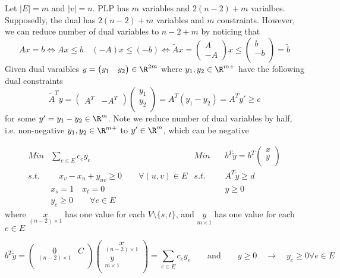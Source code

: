 \documentclass[11pt]{article}
\begin{document}
\noindent Let $|E| = m$ and $|v| = n$. PLP has $m$ variables and $2(n-2)+m$ varialbes. Supposedly, the dual has $2(n-2) + m$ variables and $m$ constraints. However, we can reduce number of dual variables to $n-2+m$ by noticing that 
\[
    Ax = b \iff Ax \leq b \quad (-A) x \leq (-b) \iff 
    \tilde{A}x =
    \begin{pmatrix}
        A \\
        -A
    \end{pmatrix}
    x \leq 
    \begin{pmatrix}
        b \\
        -b \\
    \end{pmatrix}
    =  \tilde{b}
\]
Given dual varaibles $y = \begin{pmatrix} y_1 & y_2 \end{pmatrix} \in\R^{2m}$ where $y_1,y_2\in\R^{m+}$ have the following dual constraints 
\[
    \tilde{A}^T y = 
    \begin{pmatrix}
        A^T & -A^T 
    \end{pmatrix}
    \begin{pmatrix}
        y_1 \\
        y_2 \\ 
    \end{pmatrix} 
    = A^T(y_1 - y_2) 
    = A^T y'
    \geq c 
\]
for some $y' = y_1 - y_2 \in\R^m$. Note we reduce number of dual variables by half, i.e. non-negative $y_1,y_2 \in\R^{m+}$ to $y' \in\R^m$, which can be negative

\begin{align*}
    Min &\sum_{e\in E} c_e y_e 
    &
    Min \quad &b^T \tilde{y}
    = b^T \begin{pmatrix}
        x \\ y \\
    \end{pmatrix}
    \\
    s.t.& \quad x_v - x_u + y_{uv} \geq 0 \qquad \forall (u,v)\in E 
    & 
    s.t.& A^T \tilde{y} \geq d \\
    & x_s = 1 \quad x_t = 0  
    &
    &y \geq 0 
    \\
    & y_e \geq 0 \qquad \forall e\in E
\end{align*}
where $\underset{(n-2)\times 1}{x}$ has one value for each $V\setminus \{s,t\}$, and $\underset{m\times 1}{y}$ has one value for each $e\in E$


\[
    b^T \tilde{y} = 
    \begin{pmatrix}
        \underset{(n-2)\times 1}{0} & C \\
    \end{pmatrix}
    \begin{pmatrix}
        \underset{(n-2)\times 1} x \\
        \underset{m\times 1} y \\ 
    \end{pmatrix}
    = \sum_{e\in E} c_e y_e   
    \qquad \text{and}\qquad 
    y\geq 0 \quad \rightarrow \quad y_e \geq 0 \forall e\in E
\]
\end{document}
